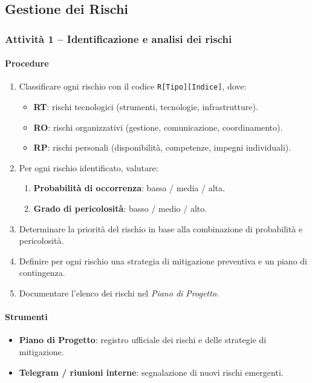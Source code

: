 \documentclass[a4paper, 11pt, oneside]{scrartcl}
\begin{document}
\subsection{Gestione dei Rischi}

\subsubsection{Attività 1 – Identificazione e analisi dei rischi}

\paragraph{Procedure}
\begin{enumerate}
    \item Classificare ogni rischio con il codice \texttt{R[Tipo][Indice]}, dove:
    \begin{itemize}
        \item \textbf{RT}: rischi tecnologici (strumenti, tecnologie, infrastrutture).
        \item \textbf{RO}: rischi organizzativi (gestione, comunicazione, coordinamento).
        \item \textbf{RP}: rischi personali (disponibilità, competenze, impegni individuali).
    \end{itemize}
    \item Per ogni rischio identificato, valutare:
    \begin{enumerate}[label=\alph*.]
        \item \textbf{Probabilità di occorrenza}: bassa / media / alta.
        \item \textbf{Grado di pericolosità}: basso / medio / alto.
    \end{enumerate}
    \item Determinare la priorità del rischio in base alla combinazione di probabilità e pericolosità.
    \item Definire per ogni rischio una strategia di mitigazione preventiva e un piano di contingenza.
    \item Documentare l'elenco dei rischi nel \emph{Piano di Progetto}{\scriptsize{}}.
\end{enumerate}

\paragraph{Strumenti}
\begin{itemize}
    \item \textbf{Piano di Progetto}: registro ufficiale dei rischi e delle strategie di mitigazione.
    \item \textbf{Telegram / riunioni interne}: segnalazione di nuovi rischi emergenti.
\end{itemize}
\end{document}
